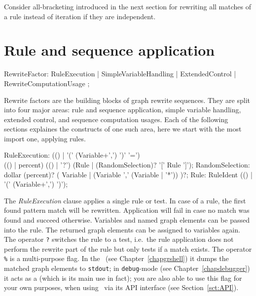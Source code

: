 \begin{note}
Consider all-bracketing introduced in the next section for rewriting all matches of a rule instead of iteration if they are independent.
\end{note}

\section{Rule and sequence application} \label{sec:ruleapplication}

\begin{rail} 
  RewriteFactor: RuleExecution
     | SimpleVariableHandling
     | ExtendedControl
     | RewriteComputationUsage
	; 
\end{rail}

Rewrite factors are the building blocks of graph rewrite sequences.
They are split into four major areas: rule and sequence application, simple variable handling, extended control, and sequence computation usages.
Each of the following sections explaines the constructs of one such area, here we start with the most import one, applying rules.

\begin{rail}    
  RuleExecution: (() | '(' (Variable+',') ')' '=') \\ (() | percent) (() | '?') (Rule | (RandomSelection)? '[' Rule ']');
  RandomSelection: dollar (percent)? ( Variable | (Variable ',' (Variable | '*')) )?;
  Rule: RuleIdent (() | '(' (Variable+',') ')');
\end{rail}

The \emph{RuleExecution} clause applies a single rule or test.
In case of a rule, the first found pattern match will be rewritten.
Application will fail in case no match was found and succeed otherwise. 
Variables and named graph elements can be passed into the rule.
The returned graph elements can be assigned to variables again.
The operator \texttt{?} switches the rule to a test, i.e.\ the rule application does not perform the rewrite part of the rule but only tests if a match exists.
The operator \texttt{\%} is a multi-purpose flag. 
In the \GrShell\ (see Chapter~\ref{chapgrshell}) it dumps the matched graph elements to \texttt{stdout};
in \texttt{debug}-mode (see Chapter~\ref{chapdebugger}) it acts as a  (which is its main use in fact);
you are also able to use this flag for your own purposes, when using \GrG\ via its API interface (see Section~\ref{sct:API}).

